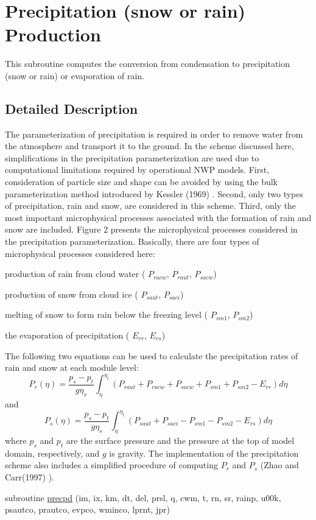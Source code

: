 \hypertarget{group__precip}{}\section{Precipitation (snow or rain) Production}
\label{group__precip}


This subroutine computes the conversion from condensation to precipitation (snow or rain) or evaporation of rain.  




\subsection{Detailed Description}
The parameterization of precipitation is required in order to remove water from the atmosphere and transport it to the ground. In the scheme discussed here, simplifications in the precipitation parameterization are used due to computational limitations required by operational N\+WP models. First, consideration of particle size and shape can be avoided by using the bulk parameterization method introduced by Kessler (1969) \cite{kessler_1969}. Second, only two types of precipitation, rain and snow, are considered in this scheme. Third, only the most important microphysical processes associated with the formation of rain and snow are included. Figure 2 presents the microphysical processes considered in the precipitation parameterization.  Basically, there are four types of microphysical processes considered here\+:
\begin{DoxyItemize}
\item production of rain from cloud water ( $P_{racw}$, $P_{raut}$, $P_{sacw}$)
\item production of snow from cloud ice ( $P_{saut}$, $P_{saci}$)
\item melting of snow to form rain below the freezing level ( $P_{sm1}$, $P_{sm2}$)
\item the evaporation of precipitation ( $E_{rr}$, $E_{rs}$)
\end{DoxyItemize}

The following two equations can be used to calculate the precipitation rates of rain and snow at each module level\+: \[ P_{r}(\eta)=\frac{p_{s}-p_{t}}{g\eta_{s}}\int_{\eta}^{\eta_{t}}(P_{raut}+P_{racw}+P_{sacw}+P_{sm1}+P_{sm2}-E_{rr})d\eta \] and \[ P_{s}(\eta)=\frac{p_{s}-p_{t}}{g\eta_{s}}\int_{\eta}^{\eta_{t}}(P_{saut}+P_{saci}-P_{sm1}-P_{sm2}-E_{rs})d\eta \] where $p_{s}$ and $p_{t}$ are the surface pressure and the pressure at the top of model domain, respectively, and $g$ is gravity. The implementation of the precipitation scheme also includes a simplified procedure of computing $P_{r}$ and $P_{s}$ (Zhao and Carr(1997) \cite{zhao_and_carr_1997}). \begin{DoxyCompactItemize}
\item 
subroutine \hyperlink{group__precip_ga5b7dbb93ea6f466ef61be5b331cbc265}{precpd} (im, ix, km, dt, del, prsl, q, cwm, t, rn, sr, rainp, u00k, psautco, prautco, evpco, wminco, lprnt, jpr)
\end{DoxyCompactItemize}


